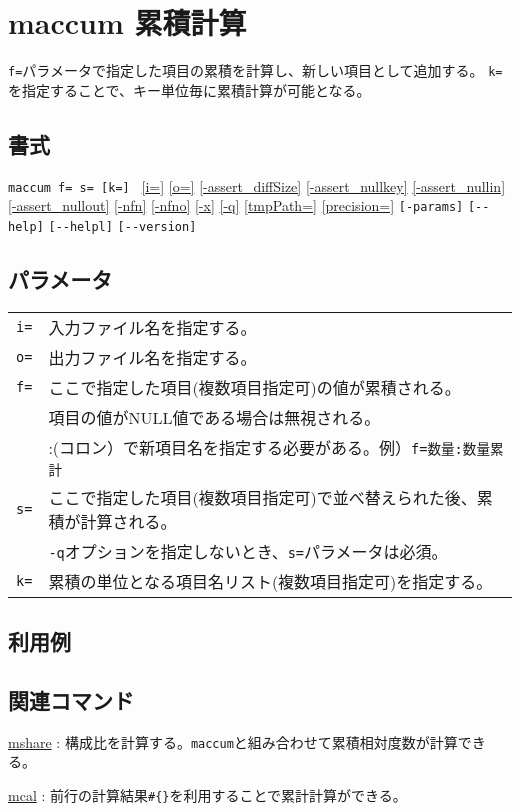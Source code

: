 
%

\section{maccum 累積計算\label{sect:maccum}}
\verb|f=|パラメータで指定した項目の累積を計算し、新しい項目として追加する。
\verb|k=|を指定することで、キー単位毎に累積計算が可能となる。

\subsection*{書式}
\verb|maccum f= s= [k=] |
\hyperref[sect:option_i]{[i=]}
\hyperref[sect:option_o]{[o=]}
\hyperref[sect:option_assert_diffSize]{[-assert\_diffSize]}
\hyperref[sect:option_assert_nullkey]{[-assert\_nullkey]}
\hyperref[sect:option_assert_nullin]{[-assert\_nullin]}
\hyperref[sect:option_assert_nullout]{[-assert\_nullout]}
\hyperref[sect:option_nfn]{[-nfn]} 
\hyperref[sect:option_nfno]{[-nfno]}  
\hyperref[sect:option_x]{[-x]}
\hyperref[sect:option_q]{[-q]}
\hyperref[sect:option_option_tmppath]{[tmpPath=]}
\hyperref[sect:option_precision]{[precision=]}
\verb|[-params]|
\verb|[--help]|
\verb|[--helpl]|
\verb|[--version]|\\

\subsection*{パラメータ}
\begin{table}[htbp]
{\small
\begin{tabular}{ll}
\verb|i=|    & 入力ファイル名を指定する。\\
\verb|o=|    & 出力ファイル名を指定する。\\
\verb|f=|    & ここで指定した項目(複数項目指定可)の値が累積される。\\
             & 項目の値がNULL値である場合は無視される。\\
             & :(コロン）で新項目名を指定する必要がある。例）\verb|f=数量:数量累計| \\
\verb|s=|    & ここで指定した項目(複数項目指定可)で並べ替えられた後、累積が計算される。\\
             & \verb|-q|オプションを指定しないとき、\verb|s=|パラメータは必須。\\
\verb|k=|    & 累積の単位となる項目名リスト(複数項目指定可)を指定する。\\
\end{tabular} 
}
\end{table} 

\subsection*{利用例}


\subsection*{関連コマンド}
\hyperref[sect:mshare]{mshare} : 構成比を計算する。\verb|maccum|と組み合わせて累積相対度数が計算できる。

\hyperref[sect:mcal]{mcal} : 前行の計算結果\verb|#{}|を利用することで累計計算ができる。

%
